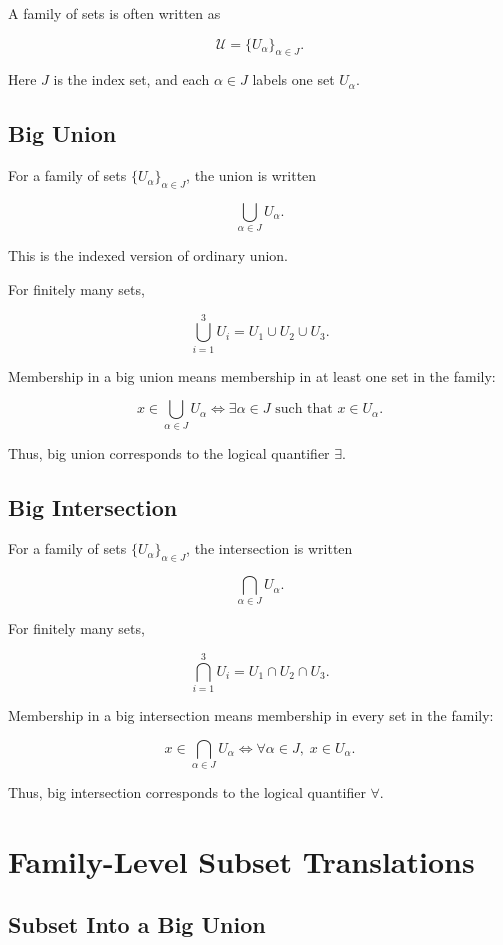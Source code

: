 \documentclass{article}
\begin{document}
	A family of sets is often written as
	
	$$
	\mathcal{U} = \{U_\alpha\}_{\alpha \in J}.
	$$
	
	Here $J$ is the index set, and each $\alpha \in J$ labels one set $U_\alpha$.
	
	\subsection{Big Union}
	
	For a family of sets $\{U_\alpha\}_{\alpha \in J}$, the union is written
	
	$$
	\bigcup_{\alpha \in J} U_\alpha.
	$$
	
	This is the indexed version of ordinary union.
	
	For finitely many sets,
	
	$$
	\bigcup_{i=1}^{3} U_i
	=
	U_1 \cup U_2 \cup U_3.
	$$
	
	Membership in a big union means membership in at least one set in the family:
	
	$$
	x \in \bigcup_{\alpha \in J} U_\alpha
	\iff
	\exists \alpha \in J \text{ such that } x \in U_\alpha.
	$$
	
	Thus, big union corresponds to the logical quantifier $\exists$.
	
	\subsection{Big Intersection}
	
	For a family of sets $\{U_\alpha\}_{\alpha \in J}$, the intersection is written
	
	$$
	\bigcap_{\alpha \in J} U_\alpha.
	$$
	
	For finitely many sets,
	
	$$
	\bigcap_{i=1}^{3} U_i
	=
	U_1 \cap U_2 \cap U_3.
	$$
	
	Membership in a big intersection means membership in every set in the family:
	
	$$
	x \in \bigcap_{\alpha \in J} U_\alpha
	\iff
	\forall \alpha \in J,\; x \in U_\alpha.
	$$
	
	Thus, big intersection corresponds to the logical quantifier $\forall$.
	
	\section{Family-Level Subset Translations}
	
	\subsection{Subset Into a Big Union}
	
\end{document}
